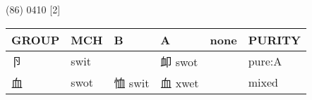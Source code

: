 \documentclass[14pt,a4paper]{scrartcl}
\begin{document}
(86) 0410 {[}2{]}

\begin{longtable}[c]{@{}llllll@{}}
\toprule
\begin{minipage}[b]{0.14\columnwidth}\raggedright\strut
GROUP
\strut\end{minipage} &
\begin{minipage}[b]{0.14\columnwidth}\raggedright\strut
MCH
\strut\end{minipage} &
\begin{minipage}[b]{0.14\columnwidth}\raggedright\strut
B
\strut\end{minipage} &
\begin{minipage}[b]{0.14\columnwidth}\raggedright\strut
A
\strut\end{minipage} &
\begin{minipage}[b]{0.14\columnwidth}\raggedright\strut
none
\strut\end{minipage} &
\begin{minipage}[b]{0.14\columnwidth}\raggedright\strut
PURITY
\strut\end{minipage}\tabularnewline
\midrule
\endhead
\begin{minipage}[t]{0.14\columnwidth}\raggedright\strut
卪
\strut\end{minipage} &
\begin{minipage}[t]{0.14\columnwidth}\raggedright\strut
swit
\strut\end{minipage} &
\begin{minipage}[t]{0.14\columnwidth}\raggedright\strut
\strut\end{minipage} &
\begin{minipage}[t]{0.14\columnwidth}\raggedright\strut
卹 swot
\strut\end{minipage} &
\begin{minipage}[t]{0.14\columnwidth}\raggedright\strut
\strut\end{minipage} &
\begin{minipage}[t]{0.14\columnwidth}\raggedright\strut
pure:A
\strut\end{minipage}\tabularnewline
\begin{minipage}[t]{0.14\columnwidth}\raggedright\strut
血
\strut\end{minipage} &
\begin{minipage}[t]{0.14\columnwidth}\raggedright\strut
swot
\strut\end{minipage} &
\begin{minipage}[t]{0.14\columnwidth}\raggedright\strut
恤 swit
\strut\end{minipage} &
\begin{minipage}[t]{0.14\columnwidth}\raggedright\strut
血 xwet
\strut\end{minipage} &
\begin{minipage}[t]{0.14\columnwidth}\raggedright\strut
\strut\end{minipage} &
\begin{minipage}[t]{0.14\columnwidth}\raggedright\strut
mixed
\strut\end{minipage}\tabularnewline
\bottomrule
\end{longtable}
\end{document}
